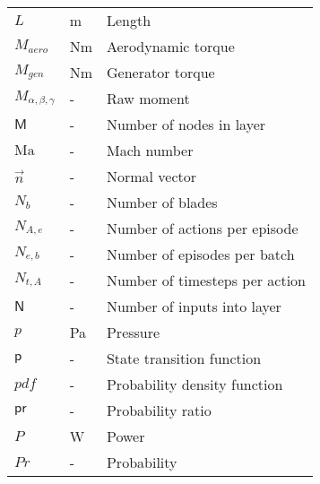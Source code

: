 \begin{longtable}{p{5cm}p{4cm}p{5cm}}
    $L$						& \si{m}		& Length \\
    $M_{aero}$				& \si{Nm}		& Aerodynamic torque \\
    $M_{gen}$				& \si{Nm}		& Generator torque \\
    $M_{\alpha, \beta, \gamma}$	& \si{-}	& Raw moment \\
    $\mathsf{M}$			& \si{-}		& Number of nodes in layer \\
    $\mathrm{Ma}$			& \si{-}		& Mach number \\
    $\vec{n}$ 				& \si{-}		& Normal vector \\
    $N_b$					& \si{-}		& Number of blades \\
    $N_{A,e}$				& \si{-}		& Number of actions per episode \\
    $N_{e,b}$				& \si{-}		& Number of episodes per batch \\
    $N_{t,A}$				& \si{-}		& Number of timesteps per action \\
    $\mathsf{N}$			& \si{-}		& Number of inputs into layer \\
    $p$                     & \si{Pa}     	& Pressure \\
    $\mathsf{p}$			& \si{-}		& State transition function \\
    $pdf$					& \si{-}		& Probability density function \\
    $\mathsf{pr}$			& \si{-}		& Probability ratio \\
    $P$						& \si{W}		& Power \\
    $Pr$					& \si{-}		& Probability \\

\end{longtable}
